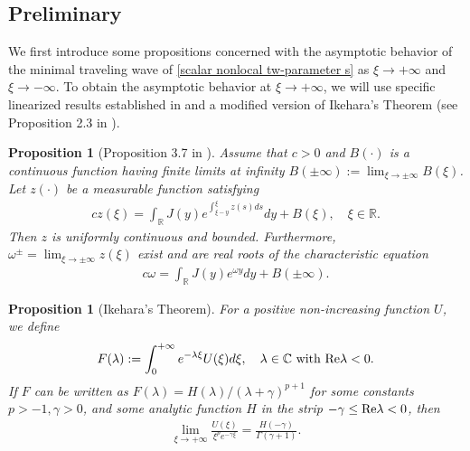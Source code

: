 \documentclass[11pt,a4paper]{article}
\newtheorem{proposition}[theorem]{\textbf{Proposition}}
\numberwithin{equation}{section}
\numberwithin{figure}{section}
\newcommand\dps{\displaystyle}
\newcommand\beaa{\begin{eqnarray*}}
\newcommand\eeaa{\end{eqnarray*}}
\begin{document}
\subsection{Preliminary}
We first introduce some propositions concerned with the asymptotic behavior of the minimal traveling wave of \eqref{scalar nonlocal tw-parameter s} as $\xi\to+\infty$ and $\xi\to-\infty$.
To obtain the asymptotic behavior at $\xi\to+\infty$, we will use specific linearized results established in \cite{Chen Fu Guo, Zhang_etal2012} and a modified version of Ikehara's Theorem (see Proposition 2.3 in \cite{Carr Chmaj}).
\begin{proposition}[Proposition 3.7 in \cite{Zhang_etal2012}]\label{prop:Zhang-etal}
Assume that $c>0$ and $B(\cdot)$ is a continuous function having finite limits at infinity $B(\pm \infty):=\lim_{\xi\to\pm\infty}B(\xi)$.
Let $z(\cdot)$ be a measurable function satisfying
\beaa%
c z(\xi)=\int_{\mathbb{R}}J(y)e^{\int_{\xi-y}^{\xi}z(s)ds}dy+B(\xi),\quad \xi\in\mathbb{R}.
\eeaa
Then $z$ is uniformly continuous and bounded. Furthermore, $\omega^{\pm} = \lim_{\xi\to\pm\infty} z(\xi)$ exist and are real roots of the
characteristic equation
\beaa
c\omega=\int_{\mathbb{R}}J(y)e^{\omega y}dy+B(\pm\infty).
\eeaa
\end{proposition}

\begin{proposition}[Ikehara's Theorem]\label{prop:ikehara}
For a positive non-increasing function $U$, we define
\begin{eqnarray*}
\dps F(\lambda):=\int_0^{+\infty} e^{-\lambda\xi} U(\xi) d\xi,\quad
\mbox{$\lambda\in\mathbb{C}$ with ${\rm Re}\lambda<0$}.
\end{eqnarray*}
If $F$ can be written as
$F(\lambda)={H(\lambda)}/{(\lambda+\gamma)^{p+1}}$
for some constants $p>-1, \gamma>0$, and some analytic function $H$
in the strip $-\gamma\leq {\rm Re}\lambda<0$, then
\begin{eqnarray*}
\lim_{\xi\rightarrow +\infty}
\frac{U(\xi)}{{\xi}^{p}e^{-\gamma\xi}}=\frac{H(-\gamma)}{\Gamma(\gamma+1)}.
\end{eqnarray*}
\end{proposition}
\end{document}

